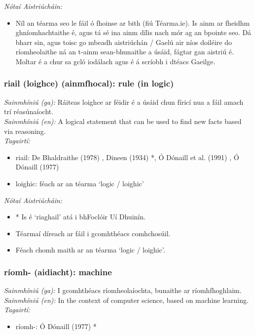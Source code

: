  \noindent \textit{Nótaí Aistriúcháin:}
\begin{itemize}
	\item Níl an téarma seo le fáil ó fhoinse ar bith (fiú Téarma.ie). Is ainm ar fheidhm ghníomhachtaithe é, agus tá sé ina ainm dílis nach mór ag an bpointe seo. Dá bharr sin, agus toisc go mbeadh aistriúchán / Gaelú air níos doiléire do ríomheolaithe ná an t-ainm sean-bhunaithe a úsáid, fágtar gan aistriú é. Moltar é a chur sa gcló iodálach agus é á scríobh i dtéacs Gaeilge.
\end{itemize}


\subsubsection*{riail (loighce) (ainmfhocal): rule (in logic)}
 \noindent \textit{Sainmhíniú (ga):} Ráiteas loighce ar féidir é a úsáid chun fíricí nua a fáil amach trí réasúnaíocht.
\\
 \noindent \textit{Sainmhíniú (en):} A logical statement that can be used to find new facts based via reasoning.
\\
 \noindent \textit{Tagairtí:}
\begin{itemize}
	\item riail: De Bhaldraithe (1978) \cite{de-bhaldraithe}, Dineen (1934) \cite{dineen}*, Ó Dónaill et al. (1991) \cite{focloir-beag}, Ó Dónaill (1977) \cite{odonaill}
	\item loighic: féach ar an téarma `logic / loighic'
\end{itemize}

 \noindent \textit{Nótaí Aistriúcháin:}
\begin{itemize}
	\item * Is é `riaghail' atá i bhFoclóir Uí Dhuinín.
	\item Téarmaí díreach ar fáil i gcomhthéacs comhchosúil.
	\item Féach chomh maith ar an téarma `logic / loighic'.
\end{itemize}


\subsubsection*{ríomh- (aidiacht): machine}
 \noindent \textit{Sainmhíniú (ga):} I gcomhthéacs ríomheolaíochta, bunaithe ar ríomhfhoghlaim.
\\
 \noindent \textit{Sainmhíniú (en):} In the context of computer science, based on machine learning.
\\
 \noindent \textit{Tagairtí:}
\begin{itemize}
	\item ríomh-: Ó Dónaill (1977) \cite{odonaill}*
\end{itemize}

